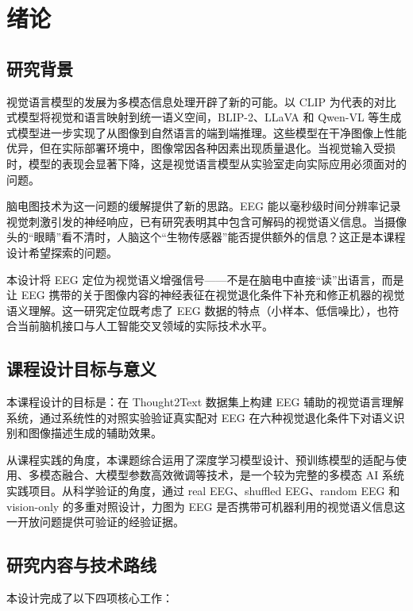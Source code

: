 \section{绪论}

\subsection{研究背景}

视觉语言模型的发展为多模态信息处理开辟了新的可能。以 CLIP 为代表的对比式模型将视觉和语言映射到统一语义空间，BLIP-2、LLaVA 和 Qwen-VL 等生成式模型进一步实现了从图像到自然语言的端到端推理。这些模型在干净图像上性能优异，但在实际部署环境中，图像常因各种因素出现质量退化。当视觉输入受损时，模型的表现会显著下降，这是视觉语言模型从实验室走向实际应用必须面对的问题。

脑电图技术为这一问题的缓解提供了新的思路。EEG 能以毫秒级时间分辨率记录视觉刺激引发的神经响应，已有研究表明其中包含可解码的视觉语义信息。当摄像头的``眼睛''看不清时，人脑这个``生物传感器''能否提供额外的信息？这正是本课程设计希望探索的问题。

本设计将 EEG 定位为视觉语义增强信号——不是在脑电中直接``读''出语言，而是让 EEG 携带的关于图像内容的神经表征在视觉退化条件下补充和修正机器的视觉语义理解。这一研究定位既考虑了 EEG 数据的特点（小样本、低信噪比），也符合当前脑机接口与人工智能交叉领域的实际技术水平。

\subsection{课程设计目标与意义}

本课程设计的目标是：在 Thought2Text 数据集上构建 EEG 辅助的视觉语言理解系统，通过系统性的对照实验验证真实配对 EEG 在六种视觉退化条件下对语义识别和图像描述生成的辅助效果。

从课程实践的角度，本课题综合运用了深度学习模型设计、预训练模型的适配与使用、多模态融合、大模型参数高效微调等技术，是一个较为完整的多模态 AI 系统实践项目。从科学验证的角度，通过 real EEG、shuffled EEG、random EEG 和 vision-only 的多重对照设计，力图为 EEG 是否携带可机器利用的视觉语义信息这一开放问题提供可验证的经验证据。

\subsection{研究内容与技术路线}

本设计完成了以下四项核心工作：

